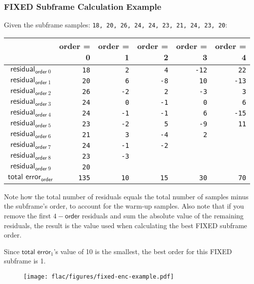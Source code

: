 \clearpage

\subsubsection{FIXED Subframe Calculation Example}

Given the subframe samples: \texttt{18, 20, 26, 24, 24, 23, 21, 24, 23, 20}:
\begin{table}[h]
\begin{tabular}{r|r|r|r|r|r}
& \textsf{order} = 0 & \textsf{order} = 1 & \textsf{order} = 2 & \textsf{order} = 3 & \textsf{order} = 4 \\
\hline
$\textsf{residual}_{\textsf{order}~0}$ & \texttt{\color{gray}18} & \texttt{\color{gray}2} & \texttt{\color{gray}4} & \texttt{\color{gray}-12} & \texttt{22} \\
$\textsf{residual}_{\textsf{order}~1}$ & \texttt{\color{gray}20} & \texttt{\color{gray}6} & \texttt{\color{gray}-8} & \texttt{10} & \texttt{-13} \\
$\textsf{residual}_{\textsf{order}~2}$ & \texttt{\color{gray}26} & \texttt{\color{gray}-2} & \texttt{2} & \texttt{-3} & \texttt{3} \\
$\textsf{residual}_{\textsf{order}~3}$ & \texttt{\color{gray}24} & \texttt{0} & \texttt{-1} & \texttt{0} & \texttt{6} \\
$\textsf{residual}_{\textsf{order}~4}$ & \texttt{24} & \texttt{-1} & \texttt{-1} & \texttt{6} & \texttt{-15} \\
$\textsf{residual}_{\textsf{order}~5}$ & \texttt{23} & \texttt{-2} & \texttt{5} & \texttt{-9} & \texttt{11} \\
$\textsf{residual}_{\textsf{order}~6}$ & \texttt{21} & \texttt{3} & \texttt{-4} & \texttt{2} \\
$\textsf{residual}_{\textsf{order}~7}$ & \texttt{24} & \texttt{-1} & \texttt{-2} \\
$\textsf{residual}_{\textsf{order}~8}$ & \texttt{23} & \texttt{-3} \\
$\textsf{residual}_{\textsf{order}~9}$ & \texttt{20} \\
\hline
$\textsf{total error}_{\textsf{order}}$ & \texttt{135} & \texttt{10} & \texttt{15} & \texttt{30} & \texttt{70} \\
\end{tabular}
\end{table}
\par
\noindent
Note how the total number of residuals equals the
total number of samples minus the subframe's order,
to account for the warm-up samples.
Also note that if you remove the first $4 - \textsf{order}$ residuals
and sum the absolute value of the remaining residuals,
the result is the  value
used when calculating the best FIXED subframe order.
\par
Since $\textsf{total error}_1$'s value of 10 is the smallest,
the best order for this FIXED subframe is 1.

\begin{figure}[h]
  \texttt{[image: flac/figures/fixed-enc-example.pdf]}
\end{figure}
